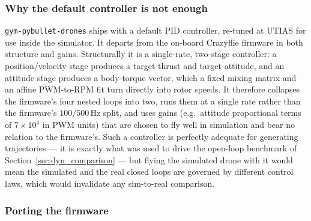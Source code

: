 \documentclass[11pt,a4paper]{article}
\theoremstyle{remark}
\numberwithin{equation}{section}
\begin{document}
\subsubsection*{Why the default controller is not enough}

\texttt{gym-pybullet-drones} ships with a default PID controller, re-tuned at
UTIAS for use inside the simulator. It departs from the on-board
Crazyflie firmware in both structure and gains. Structurally it is a single-rate,
two-stage controller: a position/velocity stage produces a target thrust and
target attitude, and an attitude stage produces a body-torque vector, which a
fixed mixing matrix and an affine PWM-to-RPM fit turn directly into rotor speeds.
It therefore collapses the firmware's four nested loops into two, runs them at a
single rate rather than the firmware's $100/500\,\mathrm{Hz}$ split, and uses
gains (e.g.\ attitude proportional terms of $7\times10^{4}$ in PWM units) that are
chosen to fly well in simulation and bear no relation to the firmware's. Such a
controller is perfectly adequate for generating trajectories --- it is exactly
what was used to drive the open-loop benchmark of
Section~\ref{sec:dyn_comparison} --- but flying the simulated drone with it would
mean the simulated and the real closed loops are governed by different control
laws, which would invalidate any sim-to-real comparison.

\subsubsection*{Porting the firmware}
\end{document}

